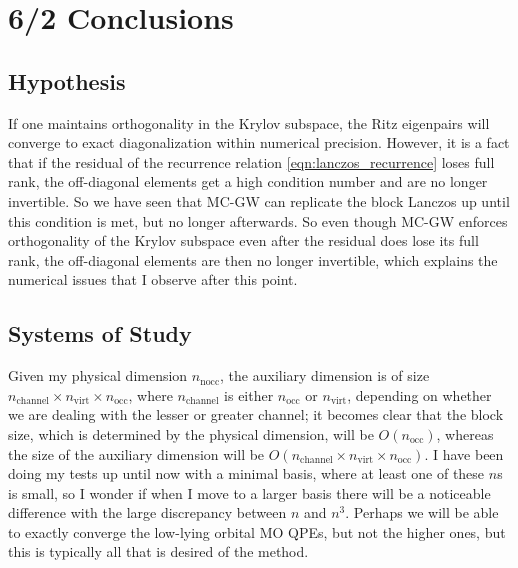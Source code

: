 \section{6/2 Conclusions}
\subsection{Hypothesis}
If one maintains orthogonality in the Krylov subspace, the Ritz eigenpairs will converge to exact diagonalization within numerical precision. However, it is a fact that if the residual of the recurrence relation \ref{eqn:lanczos_recurrence} loses full rank, the off-diagonal elements get a high condition number and are no longer invertible. So we have seen that MC-GW can replicate the block Lanczos up until this condition is met, but no longer afterwards. So even though MC-GW enforces orthogonality of the Krylov subspace even after the residual does lose its full rank, the off-diagonal elements are then no longer invertible, which explains the numerical issues that I observe after this point.
\subsection{Systems of Study}
Given my physical dimension $n_{\text{nocc}}$, the auxiliary dimension is of size $n_{\text{channel}} \times n_{\text{virt}} \times n_{\text{occ}}$, where $n_{\text{channel}}$ is either $n_{\text{occ}}$ or $n_{\text{virt}}$, depending on whether we are dealing with the lesser or greater channel; it becomes clear that the block size, which is determined by the physical dimension, will be $O(n_{\text{occ}})$, whereas the size of the auxiliary dimension will be $O(n_{\text{channel}} \times n_{\text{virt}} \times n_{\text{occ}})$. I have been doing my tests up until now with a minimal basis, where at least one of these $n$s is small, so I wonder if when I move to a larger basis there will be a noticeable difference with the large discrepancy between $n$ and $n^3$. Perhaps we will be able to exactly converge the low-lying orbital MO QPEs, but not the higher ones, but this is typically all that is desired of the method. 
